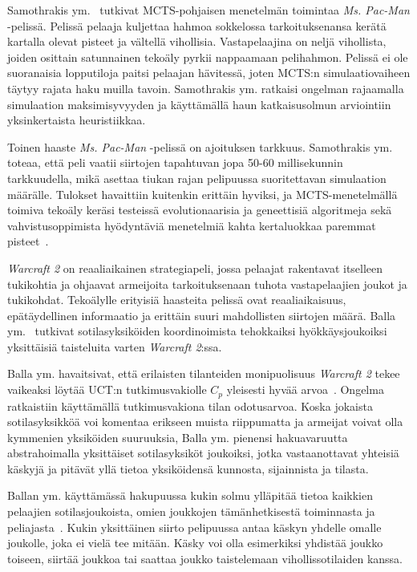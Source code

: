 \documentclass[12pt,finnish]{tktltiki2}
\theoremstyle{definition}
\theoremstyle{remark}
\begin{document}
Samothrakis ym.~\cite{samothrakis} tutkivat MCTS-pohjaisen menetelmän toimintaa \textit{Ms. Pac-Man} -pelissä. Pelissä pelaaja kuljettaa hahmoa sokkelossa tarkoituksenansa kerätä kartalla olevat pisteet ja vältellä vihollisia. Vastapelaajina on neljä vihollista, joiden osittain satunnainen tekoäly pyrkii nappaamaan pelihahmon. Pelissä ei ole suoranaisia lopputiloja paitsi pelaajan hävitessä, joten MCTS:n simulaatiovaiheen täytyy rajata haku muilla tavoin. Samothrakis ym. ratkaisi ongelman rajaamalla simulaation maksimisyvyyden ja käyttämällä haun katkaisusolmun arviointiin yksinkertaista heuristiikkaa.

Toinen haaste \textit{Ms. Pac-Man} -pelissä on ajoituksen tarkkuus. Samothrakis ym. toteaa, että peli vaatii siirtojen tapahtuvan jopa 50-60 millisekunnin tarkkuudella, mikä asettaa tiukan rajan pelipuussa suoritettavan simulaation määrälle. Tulokset havaittiin kuitenkin erittäin hyviksi, ja MCTS-menetelmällä toimiva tekoäly keräsi testeissä evolutionaarisia ja geneettisiä algoritmeja sekä vahvistusoppimista hyödyntäviä menetelmiä kahta kertaluokkaa paremmat pisteet~\cite{samothrakis}.

\textit{Warcraft 2} on reaaliaikainen strategiapeli, jossa pelaajat rakentavat itselleen tukikohtia ja ohjaavat armeijoita tarkoituksenaan tuhota vastapelaajien joukot ja tukikohdat. Tekoälylle erityisiä haasteita pelissä ovat reaaliaikaisuus, epätäydellinen informaatio ja erittäin suuri mahdollisten siirtojen määrä. Balla ym.~\cite{balla} tutkivat sotilasyksiköiden koordinoimista tehokkaiksi hyökkäysjoukoiksi yksittäisiä taisteluita varten \textit{Warcraft 2}:ssa.

Balla ym. havaitsivat, että erilaisten tilanteiden monipuolisuus \textit{Warcraft 2} tekee vaikeaksi löytää UCT:n tutkimusvakiolle $C_p$ yleisesti hyvää arvoa~\cite{balla}. Ongelma ratkaistiin käyttämällä tutkimusvakiona tilan odotusarvoa. Koska jokaista sotilasyksikköä voi komentaa erikseen muista riippumatta ja armeijat voivat olla kymmenien yksiköiden suuruuksia, Balla ym. pienensi hakuavaruutta abstrahoimalla yksittäiset sotilasyksiköt joukoiksi, jotka vastaanottavat yhteisiä käskyjä ja pitävät yllä tietoa yksiköidensä kunnosta, sijainnista ja tilasta.

Ballan ym. käyttämässä hakupuussa kukin solmu ylläpitää tietoa kaikkien pelaajien sotilasjoukoista, omien joukkojen tämänhetkisestä toiminnasta ja peliajasta~\cite{balla}. Kukin yksittäinen siirto pelipuussa antaa käskyn yhdelle omalle joukolle, joka ei vielä tee mitään. Käsky voi olla esimerkiksi yhdistää joukko toiseen, siirtää joukkoa tai saattaa joukko taistelemaan vihollissotilaiden kanssa.
\end{document}

